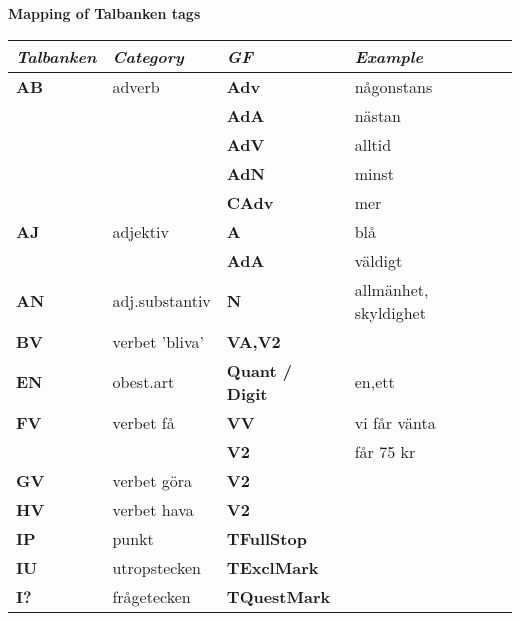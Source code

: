 \newpage
\enlargethispage{15 mm}
\textbf{Mapping of Talbanken tags} \\

\nopagebreak
\addtolength{\topmargin}{-.1000in}
\thispagestyle{empty}
\enlargethispage{\baselineskip}
\enlargethispage{\baselineskip}
\begin{tabular}{l l l l}
\emph{\textbf{Talbanken}} & \emph{\textbf{Category}}  & \emph{\textbf{GF}}     & \emph{\textbf{Example}} \\
\hline
\textbf{AB}        &  adverb           & \textbf{Adv}    & {n\aa gonstans}\\
                   &                   & \textbf{AdA}    & {n\"astan}\\
                   &                   & \textbf{AdV}    & {alltid}\\
                   &                   & \textbf{AdN}    & {minst}\\
                   &                   & \textbf{CAdv}   & {mer}\\
\textbf{AJ}        & adjektiv          &\textbf{A}      & bl\aa  \\
                   &                   &\textbf{AdA}    & v\"aldigt \\ 
\textbf{AN}        & adj.substantiv    &\textbf{N}      & allm\"anhet, skyldighet  \\ %
\textbf{BV}       & verbet 'bliva'     &\textbf{VA,V2}  & \\   
\textbf{EN}       & obest.art          & \textbf{Quant / Digit} & en,ett \\
\textbf{FV}       & verbet f\aa        & \textbf{VV}    & vi f\aa r v\"anta \\
                  &                    & \textbf{V2}    & f\aa r 75 kr \\
\textbf{GV}       & verbet g\"ora      & \textbf{V2}    & \\
\textbf{HV}       & verbet hava        & \textbf{V2}    & \\
\textbf{IP}       &  punkt             & \textbf{TFullStop}  & \\
\textbf{IU}       &  utropstecken      & \textbf{TExclMark} & \\
\textbf{I?}       &  fr\aa getecken    & \textbf{TQuestMark}& \\ 

\end{tabular}
